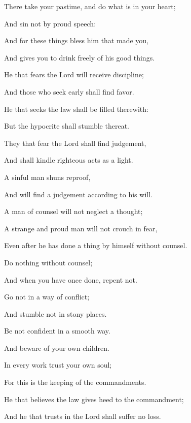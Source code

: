 {\par }{\Q {}There take your pastime, and do what is in your heart;
\par }{\Q And sin not by proud speech:
\par }{\Q {}And for these things bless him that made you,
\par }{\Q And gives you to drink freely of his good things.
\par }{\BB \par }{\Q {}He that fears the Lord will receive
{} discipline;
\par }{\Q And those who seek
{} early shall find favor.
\par }{\Q {}He that seeks the law shall be filled therewith:
\par }{\Q But the hypocrite shall stumble thereat.
\par }{\Q {}They that fear the Lord shall find judgement,
\par }{\Q And shall kindle righteous acts as a light.
\par }{\Q {}A sinful man shuns reproof,
\par }{\Q And will find a judgement according to his will.
\par }{\BB \par }{\Q {}A man of counsel will not neglect a thought;
\par }{\Q A strange and proud man will not crouch in fear,
\par }{\Q Even after he has done a thing by himself without counsel.
\par }{\Q {}Do nothing without counsel;
\par }{\Q And when you have once done, repent not.
\par }{\Q {}Go not in a way of conflict;
\par }{\Q And stumble not in stony places.
\par }{\Q {}Be not confident in a
 smooth way.
\par }{\Q {}And beware of your own children.
\par }{\Q {}In every work trust your own soul;
\par }{\Q For this is the keeping of the commandments.
\par }{\BB \par }{\Q {}He that believes the law gives heed to the commandment;
\par }{\Q And he that trusts in the Lord shall suffer no loss.

}
